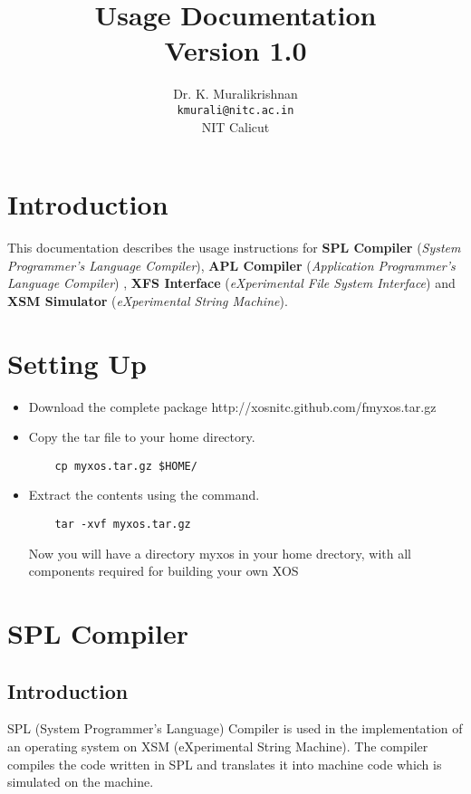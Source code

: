 \documentclass[11pt]{report}
\title{Usage Documentation \\
Version 1.0}
\author{Dr. K. Muralikrishnan  \\ \texttt{kmurali@nitc.ac.in} \\ {NIT Calicut} }
\begin{document}
\maketitle
\pagebreak

\thispagestyle{plain}

\tableofcontents
\pagebreak




\chapter{Introduction}
This documentation describes the usage instructions for \textbf{SPL Compiler} (\textit{System Programmer’s Language Compiler}), \textbf{APL Compiler} (\textit{Application Programmer’s Language Compiler}) , \textbf{XFS Interface} (\textit{eXperimental File System Interface}) and \textbf{XSM Simulator} (\textit{eXperimental String Machine}).



\chapter{Setting Up}
\begin{itemize}
\item Download the complete package http://xosnitc.github.com/fmyxos.tar.gz
\item Copy the tar file to your home directory.
	\begin{verbatim}
	cp myxos.tar.gz $HOME/
	\end{verbatim}
\item Extract the contents using the command.
	\begin{verbatim}
	tar -xvf myxos.tar.gz
	\end{verbatim}
	Now you will have a directory myxos in your home drectory, with all components required for building your own XOS

\end{itemize}


\chapter{SPL Compiler}

\section{Introduction}
SPL (System Programmer's Language) Compiler is used in the implementation of an operating system on XSM (eXperimental String Machine). The compiler compiles the code written in SPL and translates it into machine code which is simulated on the machine.
\end{document}
